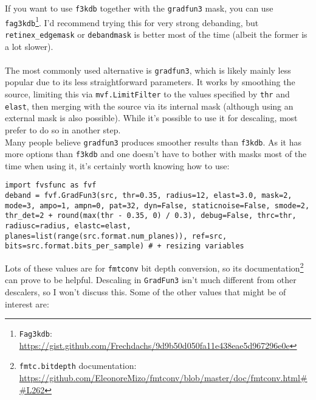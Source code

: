 \documentclass{scrartcl}
\begin{document}
If you want to use \texttt{f3kdb} together with the \texttt{gradfun3} mask, you can use \texttt{fag3kdb}\footnote{\texttt{Fag3kdb}: \url{https://gist.github.com/Frechdachs/9d9b50d050fa11e438eae5d967296e0e}}.  I'd recommend trying this for very strong debanding, but \texttt{retinex\_edgemask} or \texttt{debandmask} is better most of the time (albeit the former is a lot slower).\\
\\
The most commonly used alternative is \texttt{gradfun3}, which is likely mainly less popular due to its less straightforward parameters.  It works by smoothing the source, limiting this via \texttt{mvf.LimitFilter} to the values specified by \texttt{thr} and \texttt{elast}, then merging with the source via its internal mask (although using an external mask is also possible).  While it's possible to use it for descaling, most prefer to do so in another step.\\
Many people believe \texttt{gradfun3} produces smoother results than \texttt{f3kdb}.  As it has more options than \texttt{f3kdb} and one doesn't have to bother with masks most of the time when using it, it's certainly worth knowing how to use:
\begin{lstlisting}
import fvsfunc as fvf
deband = fvf.GradFun3(src, thr=0.35, radius=12, elast=3.0, mask=2, mode=3, ampo=1, ampn=0, pat=32, dyn=False, staticnoise=False, smode=2, thr_det=2 + round(max(thr - 0.35, 0) / 0.3), debug=False, thrc=thr, radiusc=radius, elastc=elast, planes=list(range(src.format.num_planes)), ref=src, bits=src.format.bits_per_sample) # + resizing variables
\end{lstlisting}
Lots of these values are for \texttt{fmtconv} bit depth conversion, so its documentation\footnote{\texttt{fmtc.bitdepth} documentation: \url{https://github.com/EleonoreMizo/fmtconv/blob/master/doc/fmtconv.html##L262}} can prove to be helpful.  Descaling in \texttt{GradFun3} isn't much different from other descalers, so I won't discuss this.  Some of the other values that might be of interest are:
\end{document}
